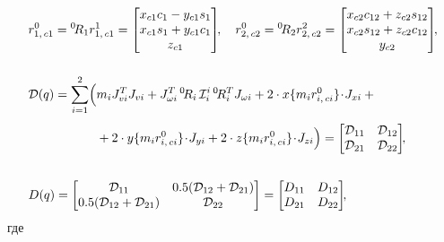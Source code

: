 \begin{align}
    & r^0_{1,\,c1} = {}^0\!R_1 r^1_{1,\,c1} =
    \begin{bmatrix}
        x_{c1} c_1 - y_{c1} s_1 \\
        x_{c1} s_1 + y_{c1} c_1 \\
        z_{c1}
    \end{bmatrix}\!\!,
    \quad
    r^0_{2,\,c2} = {}^0\!R_2 r^2_{2,\,c2} =
    \begin{bmatrix}
        x_{c2} c_{12} + z_{c2} s_{12} \\
        x_{c2} s_{12} + z_{c2} c_{12} \\
        y_{c2}
    \end{bmatrix}\!\!,
    \\[0.5cm]
     & \mathcal{D}(q) = \sum_{i=1}^2 \Bigl(m_i J_{vi}^T J_{vi} + J_{\omega i}^T \, {}^0\!R_i \, \mathcal{I}^{i}_i \, {}^0\!R_i^T J_{\omega i} + 2 \cdot x\{ m_i r^0_{i,\,ci} \} \!\cdot\! J_{xi} + {}
     \\
     & \phantom{\mathcal{D}(q) = \sum_{i=1}^2 \Bigl(} +  2 \cdot y\{ m_i r^0_{i,\,ci} \} \!\cdot\! J_{yi} + 2 \cdot z\{ m_i r^0_{i,\,ci} \} \!\cdot\! J_{zi}\Bigr) =
     \begin{bmatrix}
         \mathcal{D}_{11} & \mathcal{D}_{12} \\
         \mathcal{D}_{21} & \mathcal{D}_{22} \\
     \end{bmatrix}\!\!,
    \\[0.5cm]
    & D(q) =
    \begin{bmatrix}
        \mathcal{D}_{11} & 0.5 ( \mathcal{D}_{12} + \mathcal{D}_{21} ) \\
        0.5 ( \mathcal{D}_{12} + \mathcal{D}_{21} ) & \mathcal{D}_{22}
    \end{bmatrix}
    =
    \begin{bmatrix}
        D_{11} & D_{12} \\
        D_{21} & D_{22}
    \end{bmatrix}\!\!,
\end{align}
где
